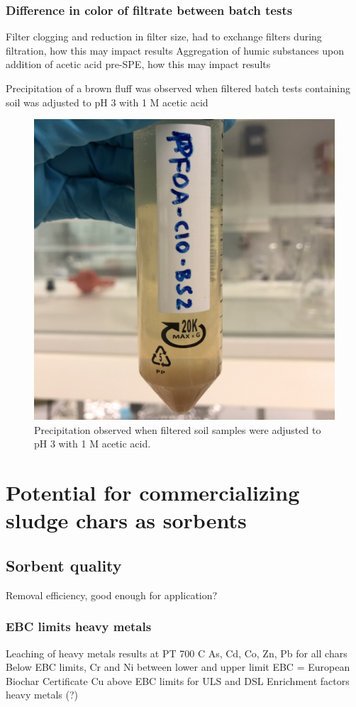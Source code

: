 \subsubsection{Difference in color of filtrate between batch tests}
Filter clogging and reduction in filter size, had to exchange filters during filtration, how this may impact results
Aggregation of humic substances upon addition of acetic acid pre-SPE, how this may impact results

Precipitation of a brown fluff was observed when filtered batch tests containing soil was adjusted to pH 3 with 1 M acetic acid

\begin{figure}
    \centering
    \includegraphics[width=0.6\linewidth,scale=0.6]{Bilder/Samples/Precipitation.jpg}
    \caption{Precipitation observed when filtered soil samples were adjusted to pH 3 with 1 M acetic acid.}
    \label{fig:precip}
\end{figure}

\section{Potential for commercializing sludge chars as sorbents}
\subsection{Sorbent quality}
Removal efficiency, good enough for application?
\subsubsection{EBC limits heavy metals}
Leaching of heavy metals results at PT 700 C
    As, Cd, Co, Zn, Pb for all chars Below EBC limits, Cr and Ni between lower and upper limit
    EBC = European Biochar Certificate
    Cu above EBC limits for ULS and DSL
    Enrichment factors heavy metals (?)

